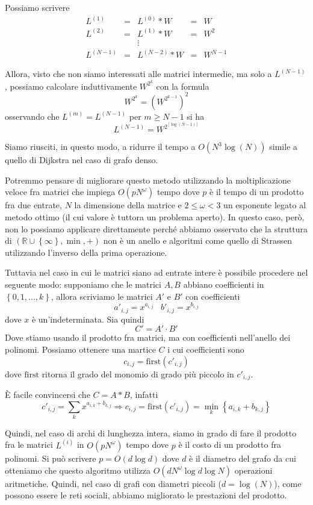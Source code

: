 \documentclass[a4paper,10pt]{amsbook}
\theoremstyle{plain}
\theoremstyle{definition}
\theoremstyle{remark}
\newcommand{\set}[1]{\left\{#1\right\}}
\newcommand{\pa}[1]{\left(#1\right)}
\newcommand{\ceil}[1]{\left\lceil#1\right\rceil}
\begin{document}
Possiamo scrivere
\begin{align*}
  L^{(1)} & = & L^{(0)} * W & = & W \\
  L^{(2)} & = & L^{(1)} * W & = & W^2 \\
  & & \vdots & & \\
  L^{(N-1)} & = & L^{(N-2)} * W & = & W^{N-1} 
\end{align*}

Allora, visto che non siamo interessati alle matrici intermedie, ma
solo a $L^{(N-1)}$, possiamo calcolare induttivamente $W^{2^k}$ con la
formula
\[ W ^{2^k} = \pa{W ^{2^{k-1}}} ^2 \]
osservando che $L^{(m)} = L^{(N-1)}$ per $m \ge N-1$ si ha
\[ L^{(N-1)} = W^{2 ^{\ceil {\log \pa{ N-1} } } } \]

Siamo riusciti, in questo modo, a ridurre il tempo a $O\pa{ N^3 \log
  (N)}$
simile a quello di Dijkstra nel caso di grafo denso.

Potremmo pensare di migliorare questo metodo utilizzando la
moltiplicazione veloce fra matrici che impiega $O\pa{pN^\omega}$ tempo
dove $p$ è il tempo di un prodotto fra due entrate, $N$ la dimensione
della matrice e $2 \le \omega <3$ un esponente legato al metodo ottimo
(il cui valore \`e tuttora un problema aperto). In questo caso, però,
non lo possiamo applicare direttamente perché abbiamo osservato che la
struttura di $\pa{ \mathbb{R} \cup \set{\infty}, \min , +}$ non è un
anello e algoritmi come quello di Strassen utilizzando l'inverso della
prima operazione.

Tuttavia nel caso in cui le matrici siano ad entrate intere \`e
possibile procedere nel seguente modo: supponiamo che le matrici $A,B$
abbiano coefficienti in $\set{0, 1,...,k}$, allora scriviamo le
matrici $A'$ e $B'$ con coefficienti
\[ a'_{i,j} = x ^{a_{i,j}} \;\;\; b'_{i,j} = x ^{b_{i,j}} \]
dove $x$ è un'indeterminata. Sia quindi
\[ C' = A' \cdot B' \]
Dove stiamo usando il prodotto fra matrici, ma con coefficienti
nell'anello dei polinomi. Possiamo ottenere una martice $C$ i cui
coefficienti sono
\[ c _{i,j} = \mathrm{first}\pa{c'_{i,j}} \]
dove $\mathrm{first}$ ritorna il grado del monomio di grado più
piccolo in $c'_{i,j}$.

È facile convincersi che $C = A * B$, infatti 
\[ c'_{i,j} = \sum _k x^{a_{i,k} + b_{k,j}} \Rightarrow c_{i,j} =
\mathrm{first} \pa{c'_{i,j}} = \min _k \set{ a_{i,k} + b_{k,j} } \]

Quindi, nel caso di archi di lunghezza intera, siamo in grado di fare
il prodotto fra le matrici $L^{(i)}$ in $O\pa{pN^\omega }$ tempo dove $p$ è
il costo di un prodotto fra polinomi. Si pu\`o scrivere $p = O\pa{d
  \log d}$ dove $d$ \`e il diametro del grafo da cui otteniamo che
questo algoritmo utilizza $O\pa{ d N ^\omega \log d \log N}$
operazioni aritmetiche. Quindi, nel caso di grafi con diametri
piccoli ($d = \log\pa{N}$), come possono essere le reti sociali, abbiamo
migliorato le prestazioni del prodotto.
\end{document}
